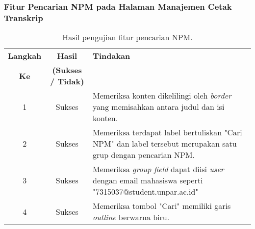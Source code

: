 \subsubsection{Fitur Pencarian NPM pada Halaman Manajemen Cetak Transkrip}
\begin{table}[H]
	\centering 
	\caption{Hasil pengujian fitur pencarian NPM.}
	\label{hasil:PencarianNPMCetakTranskrip}
	\begin{tabular}{|c| c| p{}|}
		\toprule
		\textbf{Langkah} & \textbf{Hasil} & \textbf{Tindakan}\\
		\textbf{Ke} & \textbf{(Sukses / Tidak)} &\\
		\midrule
		1&Sukses&Memeriksa konten dikelilingi oleh \textit{border} yang memisahkan antara judul dan isi konten.\\
		\hline
		2&Sukses&Memeriksa terdapat label bertuliskan "Cari NPM" dan label tersebut merupakan satu grup dengan pencarian NPM. \\
		\hline
		3&Sukses&Memeriksa \textit{group field} dapat diisi \textit{user} dengan email mahasiswa seperti "7315037@student.unpar.ac.id"\\
		\hline
		4&Sukses&Memeriksa tombol "Cari" memiliki garis \textit{outline} berwarna biru.\\
		
		\bottomrule		
	\end{tabular} 
\end{table}


